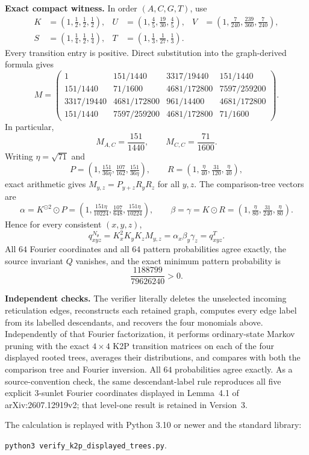 \documentclass[10pt]{article}
\newcommand{\odotv}{\mathbin{\odot}}
\begin{document}
\newpage
\textbf{Exact compact witness.} In order $(A,C,G,T)$, use
\[
\begin{aligned}
K&=(1,\tfrac12,\tfrac12,\tfrac12),&U&=(1,\tfrac45,\tfrac{19}{30},\tfrac45),&V&=(1,\tfrac7{240},\tfrac{239}{360},\tfrac7{240}),\\
S&=(1,\tfrac14,\tfrac12,\tfrac14),&T&=(1,\tfrac13,\tfrac1{27},\tfrac13).
\end{aligned}
\]
Every transition entry is positive. Direct substitution into the graph-derived formula gives
\[
M=\begin{pmatrix}
1&151/1440&3317/19440&151/1440\\
151/1440&71/1600&4681/172800&7597/259200\\
3317/19440&4681/172800&961/14400&4681/172800\\
151/1440&7597/259200&4681/172800&71/1600
\end{pmatrix}.
\]
In particular,
\[
M_{A,C}=\frac{151}{1440},\qquad M_{C,C}=\frac{71}{1600}.
\]
Writing $\eta=\sqrt{71}$ and
\[
P=(1,\tfrac{151}{36\eta},\tfrac{107}{162},\tfrac{151}{36\eta}),\qquad
R=(1,\tfrac{\eta}{40},\tfrac{31}{120},\tfrac{\eta}{40}),
\]
exact arithmetic gives $M_{y,z}=P_{y+z}R_yR_z$ for all $y,z$. The comparison-tree vectors are
\[
\alpha=K^{\odotv2}\odotv P=(1,\tfrac{151\eta}{10224},\tfrac{107}{648},\tfrac{151\eta}{10224}),\qquad
\beta=\gamma=K\odotv R=(1,\tfrac{\eta}{80},\tfrac{31}{240},\tfrac{\eta}{80}).
\]
Hence for every consistent $(x,y,z)$,
\[
q^{N_\theta}_{xyz}=K_x^2K_yK_zM_{y,z}=\alpha_x\beta_y\gamma_z=q^T_{xyz}.
\]
All $64$ Fourier coordinates and all $64$ pattern probabilities agree exactly, the source invariant $Q$ vanishes, and the exact minimum pattern probability is
\[
\frac{1188799}{79626240}>0.
\]

\textbf{Independent checks.} The verifier literally deletes the unselected incoming reticulation edges, reconstructs each retained graph, computes every edge label from its labelled descendants, and recovers the four monomials above. Independently of that Fourier factorization, it performs ordinary-state Markov pruning with the exact $4\times4$ K2P transition matrices on each of the four displayed rooted trees, averages their distributions, and compares with both the comparison tree and Fourier inversion. All $64$ probabilities agree exactly. As a source-convention check, the same descendant-label rule reproduces all five explicit 3-sunlet Fourier coordinates displayed in Lemma~4.1 of arXiv:2607.12919v2; that level-one result is retained in Version~3.

The calculation is replayed with Python 3.10 or newer and the standard library:
\begin{center}
\texttt{python3 verify\_k2p\_displayed\_trees.py}.
\end{center}
\end{document}
